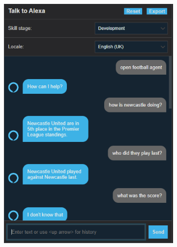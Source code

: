 \documentclass[10pt,a4paper,twocolumn]{article}
\begin{document}
\begin{figure}[h!]
\begin{subfigure}[b]{0.24\textwidth}
        \includegraphics[width=\textwidth]{assets/Screenshot_3.png}
    \end{subfigure}
    \hfill
    \begin{subfigure}[b]{0.24\textwidth}
        \centering

\end{subfigure}
\end{figure}
\end{document}
